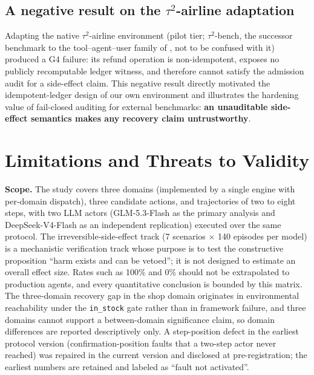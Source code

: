 \documentclass[review]{fcs}
\begin{document}
\subsection{A negative result on the $\tau^{2}$-airline adaptation}

Adapting the native $\tau^{2}$-airline environment (pilot tier; $\tau^{2}$-bench, the successor benchmark to the tool--agent--user family of \cite{ref6}, not to be confused with it) produced a G4 failure: its refund operation is non-idempotent, exposes no publicly recomputable ledger witness, and therefore cannot satisfy the admission audit for a side-effect claim. This negative result directly motivated the idempotent-ledger design of our own environment and illustrates the hardening value of fail-closed auditing for external benchmarks: \textbf{an unauditable side-effect semantics makes any recovery claim untrustworthy}.

\section{Limitations and Threats to Validity}

\textbf{Scope.} The study covers three domains (implemented by a single engine with per-domain dispatch), three candidate actions, and trajectories of two to eight steps, with two LLM actors (GLM-5.3-Flash as the primary analysis and DeepSeek-V4-Flash as an independent replication) executed over the same protocol. The irreversible-side-effect track (7 scenarios $\times$ 140 episodes per model) is a mechanistic verification track whose purpose is to test the constructive proposition ``harm exists and can be vetoed''; it is not designed to estimate an overall effect size. Rates such as 100\% and 0\% should not be extrapolated to production agents, and every quantitative conclusion is bounded by this matrix. The three-domain recovery gap in the shop domain originates in environmental reachability under the \texttt{in\_stock} gate rather than in framework failure, and three domains cannot support a between-domain significance claim, so domain differences are reported descriptively only. A step-position defect in the earliest protocol version (confirmation-position faults that a two-step actor never reached) was repaired in the current version and disclosed at pre-registration; the earliest numbers are retained and labeled as ``fault not activated''.
\end{document}
